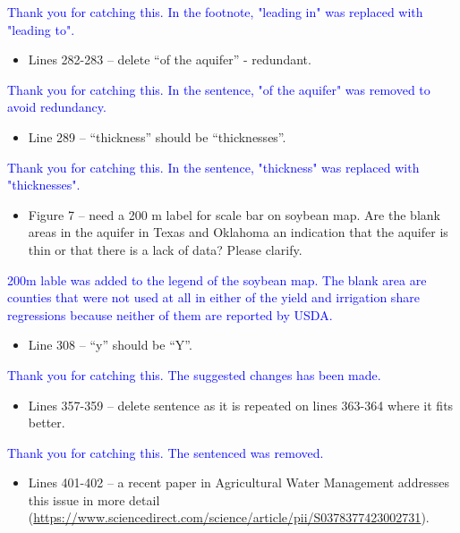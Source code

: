 \documentclass[
]{article}
\providecommand{\tightlist}{%
  \setlength{\itemsep}{0pt}\setlength{\parskip}{0pt}}
\begin{document}
\textcolor{blue}{Thank you for catching this. In the footnote, "leading in" was replaced with "leading to".}

\begin{itemize}
\tightlist
\item
  Lines 282-283 -- delete ``of the aquifer'' - redundant.
\end{itemize}

\textcolor{blue}{Thank you for catching this. In the sentence, "of the aquifer" was removed to avoid redundancy.}

\begin{itemize}
\tightlist
\item
  Line 289 -- ``thickness'' should be ``thicknesses''.
\end{itemize}

\textcolor{blue}{Thank you for catching this. In the sentence, "thickness" was replaced with "thicknesses".}

\begin{itemize}
\tightlist
\item
  Figure 7 -- need a 200 m label for scale bar on soybean map. Are the
  blank areas in the aquifer in Texas and Oklahoma an indication that
  the aquifer is thin or that there is a lack of data? Please clarify.
\end{itemize}

\textcolor{blue}{200m lable was added to the legend of the soybean map. The blank area are counties that were not used at all in either of the yield and irrigation share regressions because neither of them are reported by USDA. 
}

\begin{itemize}
\tightlist
\item
  Line 308 -- ``y'' should be ``Y''.
\end{itemize}

\textcolor{blue}{Thank you for catching this. The suggested changes has been made.}

\begin{itemize}
\tightlist
\item
  Lines 357-359 -- delete sentence as it is repeated on lines 363-364
  where it fits better.
\end{itemize}

\textcolor{blue}{Thank you for catching this. The sentenced was removed.}

\begin{itemize}
\tightlist
\item
  Lines 401-402 -- a recent paper in Agricultural Water Management
  addresses this issue in more detail
  (\url{https://www.sciencedirect.com/science/article/pii/S0378377423002731}).
\end{itemize}
\end{document}
